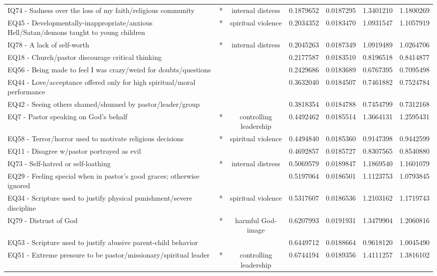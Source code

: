\documentclass[
]{article}
\begin{document}
\begin{longtable}[t]{>{\raggedright\arraybackslash}p{11cm}cccccc}
*IQ74 - Sadness over the loss of my faith/religious community & * & internal distress & 0.1879652 & 0.0187295 & 1.3401210 & 1.1800269\\
*EQ45 - Developmentally-inappropriate/anxious Hell/Satan/demons taught to young children & * & spiritual violence & 0.2034352 & 0.0183470 & 1.0931547 & 1.1057919\\
*IQ78 - A lack of self-worth & * & internal distress & 0.2045263 & 0.0187349 & 1.0919489 & 1.0264706\\
EQ18 - Church/pastor discourage critical thinking &  &  & 0.2177587 & 0.0183510 & 0.8196518 & 0.8414877\\
\addlinespace
EQ56 - Being made to feel I was crazy/weird for doubts/questions &  &  & 0.2429686 & 0.0183689 & 0.6767395 & 0.7095498\\
EQ44 - Love/acceptance offered only for high spiritual/moral performance &  &  & 0.3632040 & 0.0184507 & 0.7461882 & 0.7524784\\
EQ42 - Seeing others shamed/shunned by pastor/leader/group &  &  & 0.3818354 & 0.0184788 & 0.7454799 & 0.7312168\\
*EQ7 - Pastor speaking on God's behalf & * & controlling leadership & 0.4492462 & 0.0185514 & 1.3664131 & 1.2595431\\
*EQ58 - Terror/horror used to motivate religious decisions & * & spiritual violence & 0.4494840 & 0.0185360 & 0.9147398 & 0.9442599\\
\addlinespace
EQ11 - Disagree w/pastor portrayed as evil &  &  & 0.4692857 & 0.0185727 & 0.8307565 & 0.8540880\\
*IQ73 - Self-hatred or self-loathing & * & internal distress & 0.5069579 & 0.0189847 & 1.1869540 & 1.1601079\\
EQ29 - Feeling special when in pastor’s good graces; otherwise ignored &  &  & 0.5197064 & 0.0186501 & 1.1123753 & 1.0793845\\
*EQ34 - Scripture used to justify physical punishment/severe discipline & * & spiritual violence & 0.5317607 & 0.0186536 & 1.2103162 & 1.1719743\\
*IQ79 - Distrust of God & * & harmful God-image & 0.6207993 & 0.0191931 & 1.3479904 & 1.2060816\\
\addlinespace
EQ53 - Scripture used to justify abusive parent-child behavior &  &  & 0.6449712 & 0.0188664 & 0.9618120 & 1.0045490\\
*EQ51 - Extreme pressure to be pastor/missionary/spiritual leader & * & controlling leadership & 0.6744194 & 0.0189356 & 1.4111257 & 1.3816102\\

\end{longtable}
\end{document}
